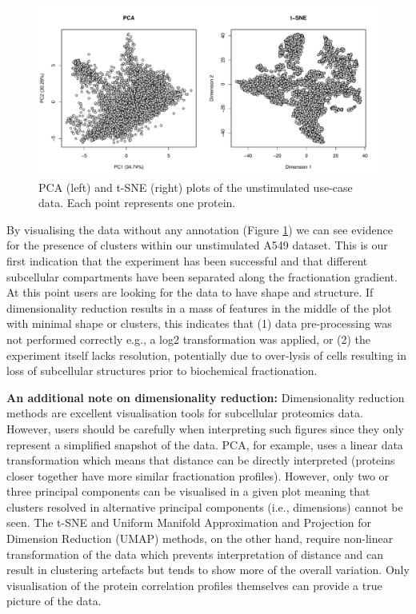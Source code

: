 \documentclass[9pt,a4paper,]{extarticle}
\begin{document}
\begin{figure}[H]

{\centering \includegraphics[width=0.9\linewidth,]{figs/map_fcol_null} 

}

\caption{PCA (left) and t-SNE (right) plots of the unstimulated use-case data. Each point represents one protein.}\label{fig:fcol-null}
\end{figure}

By visualising the data without any annotation (Figure \ref{fig:fcol-null}) we can see evidence for
the presence of clusters within our unstimulated A549 dataset. This is our first
indication that the experiment has been successful and that different subcellular
compartments have been separated along the fractionation gradient. At this point
users are looking for the data to have shape and structure. If dimensionality
reduction results in a mass of features in the middle of the plot with minimal
shape or clusters, this indicates that (1) data pre-processing was not performed
correctly e.g., a log2 transformation was applied, or (2) the experiment itself
lacks resolution, potentially due to over-lysis of cells resulting in loss of
subcellular structures prior to biochemical fractionation.

\textbf{An additional note on dimensionality reduction:}
Dimensionality reduction methods are excellent visualisation tools for
subcellular proteomics data. However, users should be carefully when interpreting
such figures since they only represent a simplified snapshot of the data. PCA,
for example, uses a linear data transformation which means that distance can be
directly interpreted (proteins closer together have more similar fractionation
profiles). However, only two or three principal components can be visualised in a given
plot meaning that clusters resolved in alternative principal components (i.e.,
dimensions) cannot be seen. The t-SNE and Uniform Manifold Approximation and
Projection for Dimension Reduction (UMAP) methods, on the other hand, require
non-linear transformation of the data which prevents interpretation of distance
and can result in clustering artefacts \citep{Wattenberg2016} but tends to show more
of the overall variation. Only visualisation of the protein correlation
profiles themselves can provide a true picture of the data.
\end{document}
